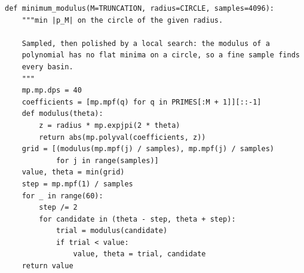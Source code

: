 \begin{verbatim}
def minimum_modulus(M=TRUNCATION, radius=CIRCLE, samples=4096):
    """min |p_M| on the circle of the given radius.

    Sampled, then polished by a local search: the modulus of a
    polynomial has no flat minima on a circle, so a fine sample finds
    every basin.
    """
    mp.mp.dps = 40
    coefficients = [mp.mpf(q) for q in PRIMES[:M + 1]][::-1]
    def modulus(theta):
        z = radius * mp.expjpi(2 * theta)
        return abs(mp.polyval(coefficients, z))
    grid = [(modulus(mp.mpf(j) / samples), mp.mpf(j) / samples)
            for j in range(samples)]
    value, theta = min(grid)
    step = mp.mpf(1) / samples
    for _ in range(60):
        step /= 2
        for candidate in (theta - step, theta + step):
            trial = modulus(candidate)
            if trial < value:
                value, theta = trial, candidate
    return value
\end{verbatim}
